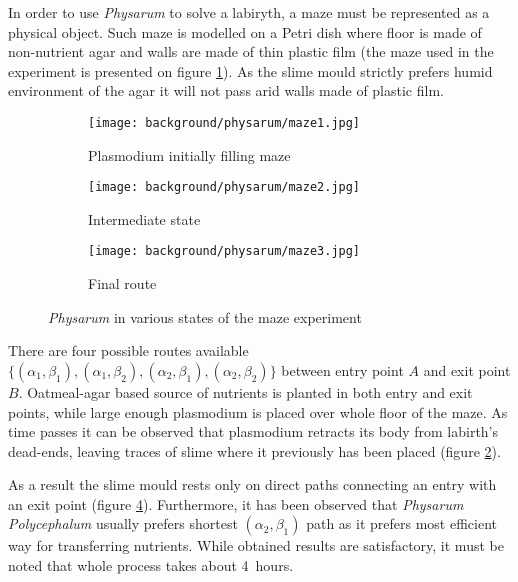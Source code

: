 In order to use \textit{Physarum} to solve a labiryth, a maze must be represented as a physical object. Such maze is modelled on a Petri dish where floor is made of non-nutrient agar and walls are made of thin plastic film (the maze used in the experiment is presented on figure \ref{figure:bp_maze_initial}). As the slime mould strictly prefers humid environment of the agar it will not pass arid walls made of plastic film. 

\begin{figure}
  \centering
  \begin{subfigure}{0.45\textwidth}
    \centering
    \texttt{[image: background/physarum/maze1.jpg]}
    \caption{Plasmodium initially filling maze}
    \label{figure:bp_maze_initial}
  \end{subfigure}
  \begin{subfigure}{0.45\textwidth}
    \centering
    \texttt{[image: background/physarum/maze2.jpg]}
    \caption{Intermediate state}
    \label{figure:bp_maze_intermediate}
  \end{subfigure}
  \begin{subfigure}{0.45\textwidth}
    \centering
    \texttt{[image: background/physarum/maze3.jpg]}
    \caption{Final route}
    \label{figure:bp_maze_final}
  \end{subfigure}
  \caption{\textit{Physarum} in various states of the maze experiment \cite{nakagaki2000intelligence}}
\end{figure}

There are four possible routes available $\{(\alpha_1,\beta_1), (\alpha_1,\beta_2), (\alpha_2,\beta_1), (\alpha_2,\beta_2)\}$ between entry point $A$ and exit point $B$. Oatmeal-agar based source of nutrients is planted in both entry and exit points, while large enough plasmodium is placed over whole floor of the maze. As time passes it can be observed that plasmodium retracts its body from labirth's dead-ends, leaving traces of slime where it previously has been placed (figure \ref{figure:bp_maze_intermediate}). 

As a result the slime mould rests only on direct paths connecting an entry with an exit point (figure \ref{figure:bp_maze_final}). Furthermore, it has been observed that \textit{Physarum Polycephalum} usually prefers shortest $(\alpha_2,\beta_1)$ path as it prefers most efficient way for transferring nutrients. While obtained results are satisfactory, it must be noted that whole process takes about 4~hours. 


